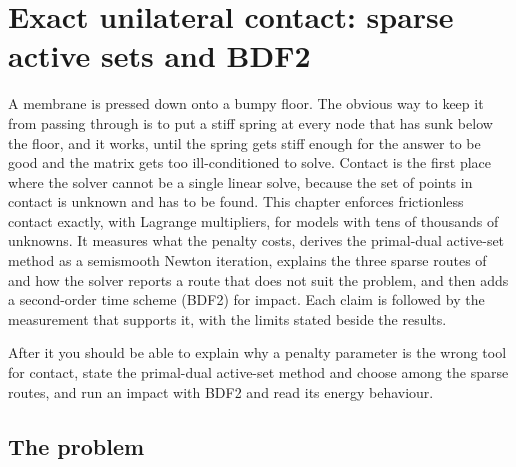 \chapter{Exact unilateral contact: sparse active sets and BDF2}\label{ch:contact}

\begin{tcolorbox}[colback=hpale,colframe=hnavy!60,coltitle=white,colbacktitle=hnavy!85,title={In this chapter}]
A membrane is pressed down onto a bumpy floor. The obvious way to keep it from passing through is to put a stiff spring at every node that has sunk below the floor, and it works, until the spring gets stiff enough for the answer to be good and the matrix gets too ill-conditioned to solve. Contact is the first place where the solver cannot be a single linear solve, because the set of points in contact is unknown and has to be found. This chapter enforces frictionless contact exactly, with Lagrange multipliers, for models with tens of thousands of unknowns. It measures what the penalty costs, derives the primal-dual active-set method as a semismooth Newton iteration, explains the three sparse routes of  and how the solver reports a route that does not suit the problem, and then adds a second-order time scheme (BDF2) for impact. Each claim is followed by the measurement that supports it, with the limits stated beside the results.\par\smallskip
After it you should be able to explain why a penalty parameter is the wrong tool for contact, state the primal-dual active-set method and choose among the sparse routes, and run an impact with BDF2 and read its energy behaviour.
\end{tcolorbox}

\section{The problem}\label{sec:ct-problem}

